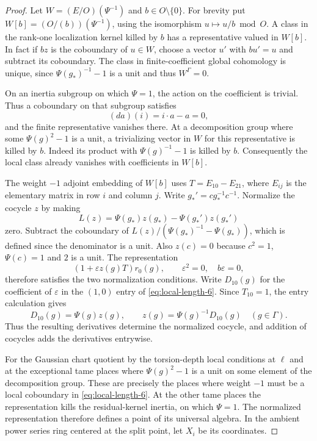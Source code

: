 \begin{proof}
Let \(W=(E/O)(\Psi^{-1})\) and \(b\in O\setminus\{0\}\).
For brevity put \(W[b]=(O/(b))(\Psi^{-1})\), using the
isomorphism \(u\mapsto u/b\bmod O\). A class in the
rank-one localization kernel killed by \(b\) has a
representative valued in \(W[b]\). In fact if \(bz\)
is the coboundary of \(u\in W\), choose a vector \(u'\)
with \(bu'=u\) and subtract its coboundary. The class
in finite-coefficient global cohomology is unique, since
\(\Psi(g_*)^{-1}-1\) is a unit and thus \(W^\Gamma=0\).

On an inertia subgroup on which \(\Psi=1\), the action on the coefficient is trivial. Thus a coboundary on that subgroup satisfies
\[
 (da)(i)=i\cdot a-a=0,
\]
and the finite representative vanishes there. At a decomposition group where some
\(\Psi(g)^2-1\) is a unit, a trivializing vector in \(W\)
for this representative is killed by \(b\). Indeed
its product with \(\Psi(g)^{-1}-1\) is killed by \(b\).
Consequently the local class already vanishes with
coefficients in \(W[b]\).

The weight \(-1\) adjoint embedding of \(W[b]\) uses
\(T=E_{10}-E_{21}\), where \(E_{ij}\) is the elementary
matrix in row \(i\) and column \(j\). Write
\(g_*'=cg_*^{-1}c^{-1}\). Normalize the cocycle \(z\)
by making
\[
    L(z)=\Psi(g_*)z(g_*)-\Psi(g_*')z(g_*')
\]
zero. Subtract the coboundary of
\(L(z)/(\Psi(g_*)^{-1}-\Psi(g_*))\), which is defined
since the denominator is a unit. Also \(z(c)=0\)
because \(c^2=1\), \(\Psi(c)=1\) and \(2\) is a unit.
The representation
\[
             (1+\varepsilon z(g)T)r_0(g),
       \qquad \varepsilon^2=0,\quad b\varepsilon=0,
             \tag{6}\label{eq:local-length-6}
\]
therefore satisfies the two normalization conditions.
Write \(D_{10}(g)\) for the coefficient of \(\varepsilon\) in the \((1,0)\) entry of \eqref{eq:local-length-6}. Since \(T_{10}=1\), the entry calculation gives
\[
    D_{10}(g)=\Psi(g)z(g),\qquad
    z(g)=\Psi(g)^{-1}D_{10}(g)\quad(g\in\Gamma).
\]
Thus the resulting derivatives determine the normalized cocycle, and addition of cocycles adds the derivatives entrywise.

For the Gaussian chart quotient by the torsion-depth
local conditions at \(\ell\) and at the exceptional
tame places where \(\Psi(g)^2-1\) is a unit on some
element of the decomposition group. These are precisely
the places where weight \(-1\) must be a local coboundary
in \eqref{eq:local-length-6}. At the other tame places the representation
kills the residual-kernel inertia, on which
\(\Psi=1\). The normalized representation therefore
defines a point of its universal algebra. In the ambient power series ring centered at the split point, let \(X_i\) be its coordinates.


\end{proof}
